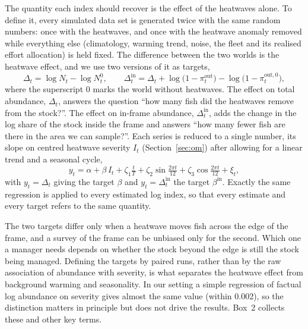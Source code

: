 \documentclass[11pt,a4paper]{article}
\newcommand{\vt}[1]{\text{#1}}
\begin{document}
The quantity each index should recover is the effect of the heatwaves alone. To define it, every simulated data set is generated twice with the same random numbers: once with the heatwaves, and once with the heatwave anomaly removed while everything else (climatology, warming trend, noise, the fleet and its realised effort allocation) is held fixed. The difference between the two worlds is the heatwave effect, and we use two versions of it as targets,
\begin{equation}
\Delta_t = \log N_t - \log N^0_t, \qquad \Delta^{\vt{in}}_t = \Delta_t + \log\big(1-\pi^{\vt{out}}_t\big) - \log\big(1-\pi^{\vt{out},0}_t\big),
\label{eq:targets}
\end{equation}
where the superscript $0$ marks the world without heatwaves. The effect on total abundance, $\Delta_t$, answers the question ``how many fish did the heatwaves remove from the stock?''. The effect on in-frame abundance, $\Delta^{\vt{in}}_t$, adds the change in the log share of the stock inside the frame and answers ``how many fewer fish are there in the area we can sample?''. Each series is reduced to a single number, its slope on centred heatwave severity $I_t$ (Section~\ref{sec:om}) after allowing for a linear trend and a seasonal cycle,
\begin{equation}
y_t = \alpha + \beta\, I_t + \zeta_1 \tfrac{t}{T} + \zeta_2 \sin\tfrac{2\pi t}{12} + \zeta_3 \cos\tfrac{2\pi t}{12} + \xi_t ,
\label{eq:regression}
\end{equation}
with $y_t=\Delta_t$ giving the target $\beta$ and $y_t=\Delta^{\vt{in}}_t$ the target $\beta^{\vt{in}}$. Exactly the same regression is applied to every estimated log index, so that every estimate and every target refers to the same quantity.

The two targets differ only when a heatwave moves fish across the edge of the frame, and a survey of the frame can be unbiased only for the second. Which one a manager needs depends on whether the stock beyond the edge is still the stock being managed. Defining the targets by paired runs, rather than by the raw association of abundance with severity, is what separates the heatwave effect from background warming and seasonality. In our setting a simple regression of factual log abundance on severity gives almost the same value (within 0.002), so the distinction matters in principle but does not drive the results. Box~2 collects these and other key terms.
\end{document}
